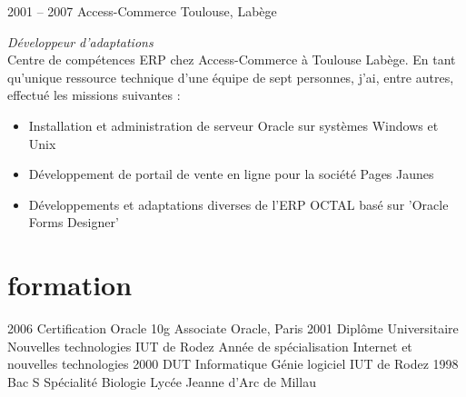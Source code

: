 \documentclass{friggeri-cv} 	%
\begin{document}
\begin{entrylist}
\entry
{2001 -- 2007}
{Access-Commerce}
{Toulouse, Labège}
{\vspace{0.2cm}\emph{Développeur d'adaptations}  \\
Centre de compétences ERP chez Access-Commerce à Toulouse Labège.
En tant qu’unique ressource technique d'une équipe de sept personnes, j’ai, entre autres, effectué les
missions suivantes :
\begin{itemize}
\item Installation et administration de serveur Oracle sur systèmes Windows et Unix
\item Développement de portail de vente en ligne pour la société Pages Jaunes
\item Développements et adaptations diverses de l'ERP OCTAL basé sur 'Oracle Forms Designer' 
\end{itemize}
}
\end{entrylist}
\newpage


\section{formation}

\begin{entrylist}
\entry
{2006}
{Certification Oracle {\normalfont 10g Associate}}
{Oracle, Paris}
{}
\entry
{2001}
{Diplôme Universitaire {\normalfont Nouvelles technologies}}
{IUT de Rodez}
{Année de spécialisation Internet et nouvelles technologies}
\entry
{2000}
{DUT {\normalfont Informatique Génie logiciel}}
{IUT de Rodez}
{}
\entry
{1998}
{Bac S {\normalfont Spécialité Biologie}}
{Lycée Jeanne d'Arc de Millau}
{}
\end{entrylist}

\end{document}

